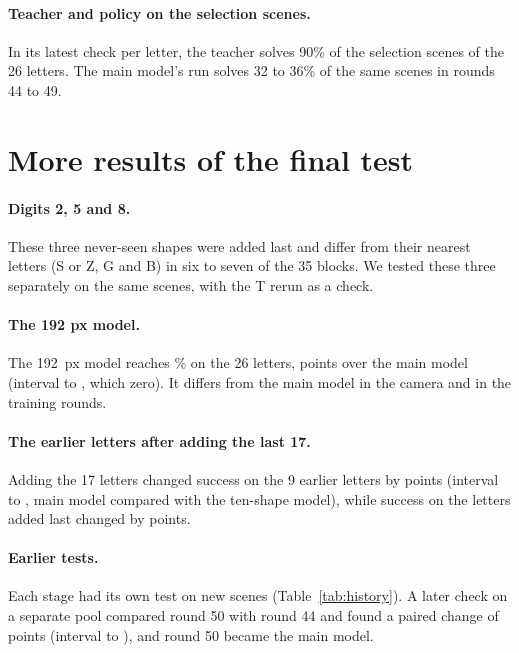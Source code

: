 \documentclass[10pt,twocolumn,letterpaper]{article}
\begin{document}
\paragraph{Teacher and policy on the selection scenes.}
In its latest check per letter, the teacher solves 90\% of the selection scenes of the 26 letters. The main model's run
solves 32 to 36\% of the same scenes in rounds 44 to 49.

\section{More results of the final test}
\label{sec:app-results}

\paragraph{Digits 2, 5 and 8.}
These three never-seen shapes were added last and differ from their nearest letters (S or Z, G and B) in six to seven
of the 35 blocks. We tested these three separately on the same scenes, with the T rerun as a check.

\paragraph{The 192 px model.}
The 192~px model reaches \numHeadHiRes\% on the 26 letters, \numVsMainHeadHiRes{} points over the main model (interval
\numVsMainHeadHiResLo{} to \numVsMainHeadHiResHi, which \numVsMainHeadHiResSig{} zero). It differs from the main model
in the camera and in the training rounds.

\paragraph{The earlier letters after adding the last 17.}
Adding the 17 letters changed success on the 9 earlier letters by \numMainOverTenEarly{} points (interval
\numMainOverTenEarlyLo{} to \numMainOverTenEarlyHi, main model compared with the ten-shape model), while success on the
letters added last changed by \numMainOverTenNew{} points.

\paragraph{Earlier tests.}
Each stage had its own test on new scenes (Table~\ref{tab:history}). A later check on a separate pool compared round
50 with round 44 and found a paired change of \numHistRoundFiftyDiff{} points (interval \numHistRoundFiftyDiffLo{} to
\numHistRoundFiftyDiffHi), and round 50 became the main model. %
\end{document}
